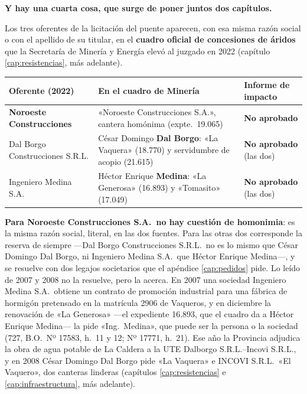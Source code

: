 \begin{cautela}
\textbf{Y hay una cuarta cosa, que surge de poner juntos dos capítulos.}

Los tres oferentes de la licitación del puente aparecen, con esa misma razón social o con el apellido de su titular, en el \textbf{cuadro oficial de concesiones de áridos} que la Secretaría de Minería y Energía elevó al juzgado en 2022 (capítulo \ref{cap:resistencias}, más adelante).

\begin{center}\small
\begin{tabular}{@{}p{3.7cm}p{5.3cm}p{3.2cm}@{}}
\toprule
\textbf{Oferente (2022)} & \textbf{En el cuadro de Minería} & \textbf{Informe de impacto} \\
\midrule
\textbf{Noroeste Construcciones} & «Noroeste Construcciones S.A.», cantera homónima (expte.\ 19.065) & \textbf{No aprobado} \\
Dal Borgo Construcciones S.R.L. & César Domingo \textbf{Dal Borgo}: «La Vaquera» (18.770) y servidumbre de acopio (21.615) & \textbf{No aprobado} (las dos) \\
Ingeniero Medina S.A. & Héctor Enrique \textbf{Medina}: «La Generosa» (16.893) y «Tomasito» (17.049) & \textbf{No aprobado} (las dos) \\
\bottomrule
\end{tabular}
\end{center}

\textbf{Para Noroeste Construcciones S.A.\ no hay cuestión de homonimia}: es la misma razón social, literal, en las dos fuentes. Para las otras dos corresponde la reserva de siempre ---Dal Borgo Construcciones S.R.L.\ no es lo mismo que César Domingo Dal Borgo, ni Ingeniero Medina S.A.\ que Héctor Enrique Medina---, y se resuelve con dos legajos societarios que el apéndice \ref{cap:pedidos} pide. Lo leído de 2007 y 2008 no la resuelve, pero la acerca. En 2007 una sociedad Ingeniero Medina S.A.\ obtiene un contrato de promoción industrial para una fábrica de hormigón pretensado en la matrícula 2906 de Vaqueros, y en diciembre la renovación de «La Generosa» ---el expediente 16.893, que el cuadro da a Héctor Enrique Medina--- la pide «Ing.\ Medina», que puede ser la persona o la sociedad (727, B.O.\ Nº 17583, h.\ 11 y 12; Nº 17771, h.\ 21). Ese año la Provincia adjudica la obra de agua potable de La Caldera a la UTE Dalborgo S.R.L.--Incovi S.R.L., y en 2008 César Domingo Dal Borgo pide «La Vaquera» e INCOVI S.R.L.\ «El Vaquero», dos canteras linderas (capítulos \ref{cap:resistencias} e \ref{cap:infraestructura}, más adelante).


\end{cautela}
